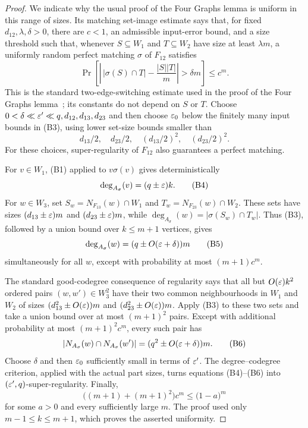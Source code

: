 \begin{proof}
We indicate why the usual proof of the Four Graphs lemma is uniform in this
range of sizes.  Its matching set-image estimate says that, for fixed
$d_{12},\lambda,\delta>0$, there are $c<1$, an admissible input-error bound,
and a size threshold such that, whenever $S\subseteq W_1$ and
$T\subseteq W_2$ have size at least $\lambda m$, a uniformly random perfect
matching $\sigma$ of $F_{12}$ satisfies
\[
 \Pr\left[
  \left|\,|\sigma(S)\cap T|-\frac{|S||T|}{m}\right|>\delta m
 \right]\leq c^m.                                    \tag{B3}
\]
This is the standard two-edge-switching estimate used in the proof of the
Four Graphs lemma~\cite{RR99}; its constants do not depend on $S$ or $T$.
Choose $0<\delta\ll\varepsilon'\ll q,d_{12},d_{13},d_{23}$ and then choose
$\varepsilon_0$ below the finitely many input bounds in (B3), using lower set-size
bounds smaller than
\[
 d_{13}/2,\quad d_{23}/2,\quad
 (d_{13}/2)^{2},\quad (d_{23}/2)^{2}.
\]
For these choices, super-regularity of $F_{12}$ also guarantees a perfect
matching.

For $v\in W_1$, (B1) applied to $v\sigma(v)$ gives deterministically
\[
  \deg_{A_\sigma}(v)=(q\pm\varepsilon)k.                    \tag{B4}
\]
For $w\in W_3$, set $S_w=N_{F_{13}}(w)\cap W_1$ and
$T_w=N_{F_{23}}(w)\cap W_2$.  These sets have sizes
$(d_{13}\pm\varepsilon)m$ and $(d_{23}\pm\varepsilon)m$, while
$\deg_{A_\sigma}(w)=|\sigma(S_w)\cap T_w|$.  Thus (B3), followed by a
union bound over $k\leq m+1$ vertices, gives
\[
  \deg_{A_\sigma}(w)=(q\pm O(\varepsilon+\delta))m          \tag{B5}
\]
simultaneously for all $w$, except with probability at most $(m+1)c^m$.

The standard good-codegree consequence of regularity says that all but
$O(\varepsilon)k^2$ ordered pairs $(w,w')\in W_3^2$ have their two common
neighbourhoods in $W_1$ and $W_2$ of sizes
$(d_{13}^2\pm O(\varepsilon))m$ and $(d_{23}^2\pm O(\varepsilon))m$.  Apply (B3) to
these two sets and take a union bound over at most $(m+1)^{2}$ pairs.  Except
with additional probability at most $(m+1)^{2}c^{m}$, every such pair has
\[
 |N_{A_\sigma}(w)\cap N_{A_\sigma}(w')|
       =(q^2\pm O(\varepsilon+\delta))m.                    \tag{B6}
\]
Choose $\delta$ and then $\varepsilon_0$ sufficiently small in terms of $\varepsilon'$.
The degree--codegree criterion, applied with the actual part sizes, turns
equations (B4)--(B6) into $(\varepsilon',q)$-super-regularity.  Finally,
\[
  \bigl((m+1)+(m+1)^{2}\bigr)c^{m}\leq\bigl(1-a\bigr)^{m}
\]
for some $a>0$ and every sufficiently large $m$.  The proof used only
$m-1\leq k\leq m+1$, which proves the asserted uniformity.
\end{proof}

